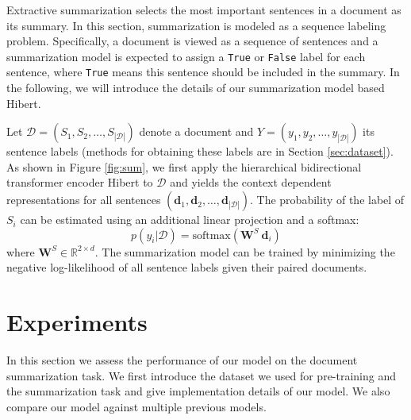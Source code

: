 \documentclass[11pt,a4paper]{article}
\begin{document}
Extractive summarization selects the most important sentences in a document as its summary. In this section, summarization is modeled as a sequence labeling problem. Specifically, a document is viewed as a sequence of sentences and a summarization model is expected to assign a {\tt True} or {\tt False} label for each sentence, where {\tt True} means this sentence should be included in the summary. In the following, we will introduce the details of our summarization model based \mbox{{\sc Hibert}}.

Let $\mathcal{D} = (S_1, S_2, \dots, S_{| \mathcal{D} |})$ denote a document and $Y = (y_1, y_2, \dots, y_{| \mathcal{D} |})$ its sentence labels (methods for obtaining these labels are in Section \ref{sec:dataset}). 
As shown in Figure \ref{fig:sum}, we first apply the hierarchical bidirectional transformer encoder \mbox{{\sc Hibert}} to $\mathcal{D}$ and yields the context dependent representations for all sentences $( \mathbf{d}_1, \mathbf{d}_2, \dots, \mathbf{d}_{|\mathcal{D}|} )$. The probability of the label of $S_i$ can be estimated using an additional linear projection and a softmax:
\begin{equation}
\label{eq:sum}
p( y_i | \mathcal{D} ) = \text{softmax}(\mathbf{W}^S \: \mathbf{d}_i)
\end{equation}
where $\mathbf{W}^S \in \mathbb{R}^{2 \times d}$. The summarization model can be trained by minimizing the negative log-likelihood of all sentence labels given their paired documents.


\section{Experiments}
In this section we assess the performance of our model on the document summarization task. We first introduce the dataset we used for pre-training and the summarization task and give implementation details of our model. We also compare our model against multiple previous models.
\end{document}
